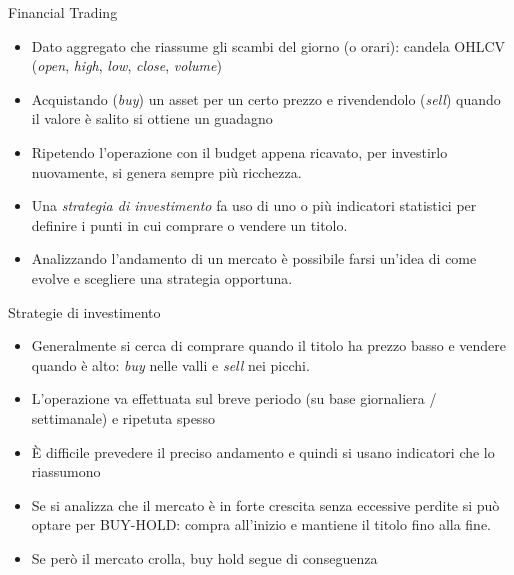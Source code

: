 \documentclass{beamer}
\begin{document}
\begin{frame}{Financial Trading}
\begin{itemize}
    \item Dato aggregato che riassume gli scambi del giorno (o orari): candela OHLCV (\textit{open}, \textit{high},     \textit{low}, \textit{close}, \textit{volume})
    \item Acquistando (\textit{buy}) un asset per un certo prezzo e rivendendolo (\textit{sell}) quando il valore è salito si ottiene un guadagno
    \item Ripetendo l'operazione con il budget appena ricavato, per investirlo nuovamente, si genera sempre più ricchezza. 
    \item Una \textit{strategia di investimento} fa uso di uno o più indicatori statistici per definire i punti in cui comprare o vendere un titolo.
    \item Analizzando l'andamento di un mercato è possibile farsi un'idea di come evolve e scegliere una strategia opportuna.
    \begin{figure}
\end{figure}
\end{itemize}
\end{frame}

\begin{frame}{Strategie di investimento}
\begin{itemize}
    \item Generalmente si cerca di comprare quando il titolo ha prezzo basso e vendere quando è alto: \textit{buy} nelle valli e \textit{sell} nei picchi. 
    \item L'operazione va effettuata sul breve periodo (su base giornaliera / settimanale) e ripetuta spesso
    \item È difficile prevedere il preciso andamento e quindi si usano indicatori che lo riassumono
    \item Se si analizza che il mercato è in forte crescita senza eccessive perdite si può optare per BUY-HOLD: compra all'inizio e mantiene il titolo fino alla fine.
    \item Se però il mercato crolla, buy hold segue di conseguenza
\end{itemize}
\end{frame}
\end{document}
